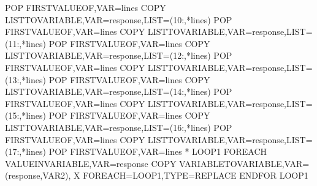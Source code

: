 \documentclass[letterpaper,10pt,english]{sphinxmanual}
\begin{document}
\begin{sphinxVerbatim}[commandchars=\\\{\}]
   POP\PYGZdl{} FIRST\PYGZhy{}VALUE\PYGZhy{}OF,VAR=\PYGZsq{}lines\PYGZsq{}
   COPY\PYGZdl{} LIST\PYGZhy{}TO\PYGZhy{}VARIABLE,VAR=\PYGZsq{}response\PYGZsq{},LIST=(\PYGZsq{}10:\PYGZsq{},\PYGZsq{}*lines\PYGZsq{})
   POP\PYGZdl{} FIRST\PYGZhy{}VALUE\PYGZhy{}OF,VAR=\PYGZsq{}lines\PYGZsq{}
   COPY\PYGZdl{} LIST\PYGZhy{}TO\PYGZhy{}VARIABLE,VAR=\PYGZsq{}response\PYGZsq{},LIST=(\PYGZsq{}11:\PYGZsq{},\PYGZsq{}*lines\PYGZsq{})
   POP\PYGZdl{} FIRST\PYGZhy{}VALUE\PYGZhy{}OF,VAR=\PYGZsq{}lines\PYGZsq{}
   COPY\PYGZdl{} LIST\PYGZhy{}TO\PYGZhy{}VARIABLE,VAR=\PYGZsq{}response\PYGZsq{},LIST=(\PYGZsq{}12:\PYGZsq{},\PYGZsq{}*lines\PYGZsq{})
   POP\PYGZdl{} FIRST\PYGZhy{}VALUE\PYGZhy{}OF,VAR=\PYGZsq{}lines\PYGZsq{}
   COPY\PYGZdl{} LIST\PYGZhy{}TO\PYGZhy{}VARIABLE,VAR=\PYGZsq{}response\PYGZsq{},LIST=(\PYGZsq{}13:\PYGZsq{},\PYGZsq{}*lines\PYGZsq{})
   POP\PYGZdl{} FIRST\PYGZhy{}VALUE\PYGZhy{}OF,VAR=\PYGZsq{}lines\PYGZsq{}
   COPY\PYGZdl{} LIST\PYGZhy{}TO\PYGZhy{}VARIABLE,VAR=\PYGZsq{}response\PYGZsq{},LIST=(\PYGZsq{}14:\PYGZsq{},\PYGZsq{}*lines\PYGZsq{})
   POP\PYGZdl{} FIRST\PYGZhy{}VALUE\PYGZhy{}OF,VAR=\PYGZsq{}lines\PYGZsq{}
   COPY\PYGZdl{} LIST\PYGZhy{}TO\PYGZhy{}VARIABLE,VAR=\PYGZsq{}response\PYGZsq{},LIST=(\PYGZsq{}15:\PYGZsq{},\PYGZsq{}*lines\PYGZsq{})
   POP\PYGZdl{} FIRST\PYGZhy{}VALUE\PYGZhy{}OF,VAR=\PYGZsq{}lines\PYGZsq{}
   COPY\PYGZdl{} LIST\PYGZhy{}TO\PYGZhy{}VARIABLE,VAR=\PYGZsq{}response\PYGZsq{},LIST=(\PYGZsq{}16:\PYGZsq{},\PYGZsq{}*lines\PYGZsq{})
   POP\PYGZdl{} FIRST\PYGZhy{}VALUE\PYGZhy{}OF,VAR=\PYGZsq{}lines\PYGZsq{}
   COPY\PYGZdl{} LIST\PYGZhy{}TO\PYGZhy{}VARIABLE,VAR=\PYGZsq{}response\PYGZsq{},LIST=(\PYGZsq{}17:\PYGZsq{},\PYGZsq{}*lines\PYGZsq{})
   POP\PYGZdl{} FIRST\PYGZhy{}VALUE\PYGZhy{}OF,VAR=\PYGZsq{}lines\PYGZsq{}
*
LOOP1    FOREACH\PYGZdl{} VALUE\PYGZhy{}IN\PYGZhy{}VARIABLE,VAR=\PYGZsq{}response\PYGZsq{}
   COPY\PYGZdl{} VARIABLE\PYGZhy{}TO\PYGZhy{}VARIABLE,VAR=(\PYGZsq{}response\PYGZsq{},\PYGZsq{}VAR2\PYGZsq{}),           X
         FOREACH=LOOP1,TYPE=REPLACE
         ENDFOR\PYGZdl{} LOOP1


\end{sphinxVerbatim}
\end{document}
